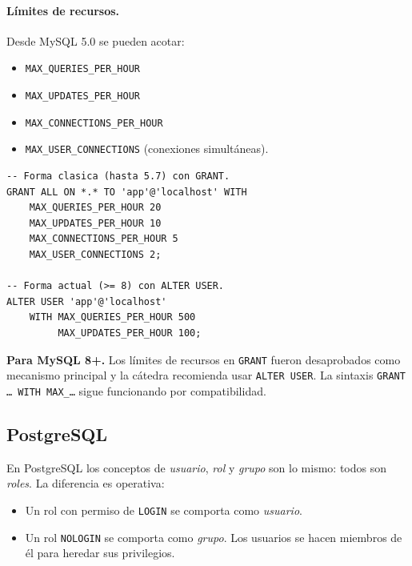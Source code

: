 \documentclass[11pt,a4paper]{article}
\begin{document}
\paragraph{Límites de recursos.} Desde MySQL 5.0 se pueden acotar:

\begin{itemize}
    \item \texttt{MAX\_QUERIES\_PER\_HOUR}
    \item \texttt{MAX\_UPDATES\_PER\_HOUR}
    \item \texttt{MAX\_CONNECTIONS\_PER\_HOUR}
    \item \texttt{MAX\_USER\_CONNECTIONS} (conexiones simultáneas).
\end{itemize}

\begin{lstlisting}
-- Forma clasica (hasta 5.7) con GRANT.
GRANT ALL ON *.* TO 'app'@'localhost' WITH
    MAX_QUERIES_PER_HOUR 20
    MAX_UPDATES_PER_HOUR 10
    MAX_CONNECTIONS_PER_HOUR 5
    MAX_USER_CONNECTIONS 2;

-- Forma actual (>= 8) con ALTER USER.
ALTER USER 'app'@'localhost'
    WITH MAX_QUERIES_PER_HOUR 500
         MAX_UPDATES_PER_HOUR 100;
\end{lstlisting}

\begin{nota}
\textbf{Para MySQL 8+.} Los límites de recursos en \texttt{GRANT} fueron
desaprobados como mecanismo principal y la cátedra recomienda usar
\texttt{ALTER USER}. La sintaxis \texttt{GRANT \dots\ WITH MAX\_\dots}
sigue funcionando por compatibilidad.
\end{nota}

\subsection{PostgreSQL}

En PostgreSQL los conceptos de \emph{usuario}, \emph{rol} y
\emph{grupo} son lo mismo: todos son \emph{roles}. La diferencia es
operativa:

\begin{itemize}
    \item Un rol con permiso de \texttt{LOGIN} se comporta como
    \emph{usuario}.
    \item Un rol \texttt{NOLOGIN} se comporta como \emph{grupo}.
    Los usuarios se hacen miembros de él para heredar sus privilegios.
\end{itemize}
\end{document}
